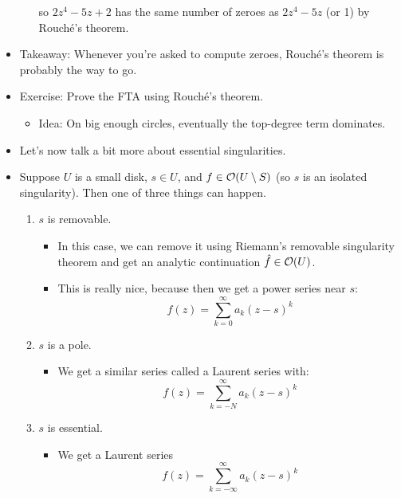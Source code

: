 \documentclass[../notes.tex]{subfiles}
\begin{document}
\begin{itemize}
\begin{itemize}
\begin{equation*}
        \end{equation*}
        so $2z^4-5z+2$ has the same number of zeroes as $2z^4-5z$ (or 1) by Rouch\'{e}'s theorem.
    \end{itemize}
    \item Takeaway: Whenever you're asked to compute zeroes, Rouch\'{e}'s theorem is probably the way to go.
    \item Exercise: Prove the FTA using Rouch\'{e}'s theorem.
    \begin{itemize}
        \item Idea: On big enough circles, eventually the top-degree term dominates.
    \end{itemize}
    \item Let's now talk a bit more about essential singularities.
    \item Suppose $U$ is a small disk, $s\in U$, and $f\in\mathcal{O}(U\setminus S)$ (so $s$ is an isolated singularity). Then one of three things can happen.
    \begin{enumerate}
        \item $s$ is removable.
        \begin{itemize}
            \item In this case, we can remove it using Riemann's removable singularity theorem and get an analytic continuation $\hat{f}\in\mathcal{O}(U)$.
            \item This is really nice, because then we get a power series near $s$:
            \begin{equation*}
                f(z) = \sum_{k=0}^\infty a_k(z-s)^k
            \end{equation*}
        \end{itemize}
        \item $s$ is a pole.
        \begin{itemize}
            \item We get a similar series called a Laurent series with:
            \begin{equation*}
                f(z) = \sum_{k=-N}^\infty a_k(z-s)^k
            \end{equation*}
        \end{itemize}
        \item $s$ is essential.
        \begin{itemize}
            \item We get a Laurent series
            \begin{equation*}
                f(z) = \sum_{k=-\infty}^\infty a_k(z-s)^k

\end{equation*}
\end{itemize}
\end{enumerate}
\end{itemize}
\end{document}
